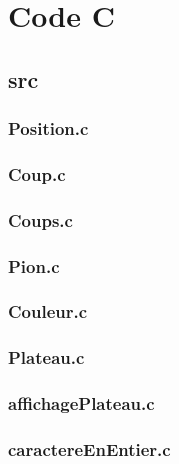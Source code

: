 \section{Code C}

\lstset{language=C}
\subsection{src}

\subsubsection{Position.c}

\vline

\subsubsection{Coup.c}

\vline

\subsubsection{Coups.c}

\vline

\subsubsection{Pion.c}

\vline

\subsubsection{Couleur.c}

\vline

\subsubsection{Plateau.c}

\vline

\subsubsection{affichagePlateau.c}

\vline

\subsubsection{caractereEnEntier.c}

\vline

